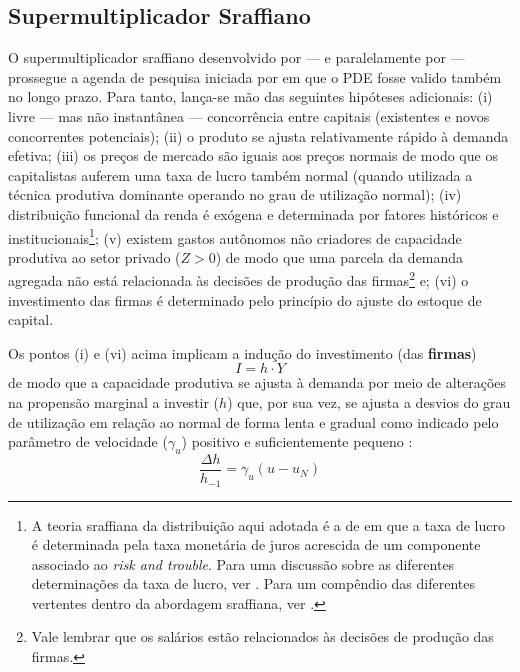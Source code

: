 \subsection{Supermultiplicador Sraffiano}\label{SecSuper}

O supermultiplicador sraffiano desenvolvido por \textcite{serrano_sraffian_1995} --- e paralelamente por \textcite{bortis_institutions_1996} --- prossegue a agenda de pesquisa iniciada por \textcite{garegnani_problem_2015} em que o PDE fosse valido também no longo prazo. 
Para tanto, lança-se mão das seguintes hipóteses adicionais: 
	(i) livre --- mas não instantânea --- concorrência entre capitais (existentes e novos concorrentes potenciais);
	(ii) o produto se ajusta relativamente rápido à demanda efetiva;
	(iii) os preços de mercado são iguais aos preços normais de modo que os capitalistas auferem uma taxa de lucro também normal (quando utilizada a técnica produtiva dominante operando no grau de utilização normal);
	(iv) distribuição funcional da renda é exógena e determinada por fatores históricos e institucionais\footnote{
		A teoria sraffiana da distribuição aqui adotada é a de \textcite{pivetti_essay_1992} em que a taxa de lucro é determinada pela taxa monetária de juros acrescida de um componente associado ao \textit{risk and trouble}.
		Para uma discussão sobre as diferentes determinações da taxa de lucro, ver \textcite{serrano_teoria_1988}.
		Para um compêndio das diferentes vertentes dentro da abordagem sraffiana, ver \textcite{aspromourgos_sraffian_2004}.
	};
	(v) existem gastos autônomos não criadores de capacidade produtiva ao setor privado ($Z>0$) de modo que uma parcela da demanda agregada não está relacionada às decisões de produção das firmas\footnote{
		Vale lembrar que os salários estão relacionados às decisões de produção das firmas.
	} e;
	(vi) o investimento das firmas é determinado pelo princípio do ajuste do estoque de capital.

Os pontos (i) e (vi) acima implicam a indução do investimento (das \textbf{firmas}) 
$$
I = h\cdot Y
$$
de modo que a capacidade produtiva se ajusta à demanda por meio de alterações na propensão marginal a investir ($h$) que, por sua vez, se ajusta a desvios do grau de utilização em relação ao normal de forma lenta e gradual como indicado pelo parâmetro de velocidade ($\gamma_u$) positivo e suficientemente pequeno \cite[p.~271]{freitas_growth_2015}:
$$
\frac{\Delta h}{h_{-1}} = \gamma_u (u - u_N)
$$

